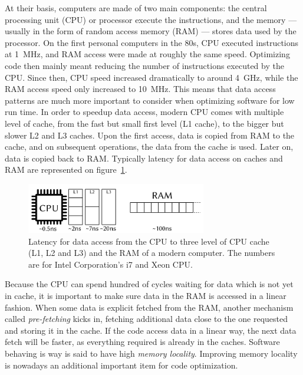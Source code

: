 \documentclass[thesis]{subfiles}
\begin{document}
At their basis, computers are made of two main components: the central
processing unit (CPU) or processor execute the instructions, and the memory ---
usually in the form of random access memory (RAM) --- stores data used by the
processor. On the first personal computers in the 80s, CPU executed instructions
at \SI{1}{MHz}, and RAM access were made at roughly the same speed. Optimizing
code then mainly meant reducing the number of instructions executed by the CPU.
Since then, CPU speed increased dramatically to around \SI{4}{GHz}, while the
RAM access speed only increased to \SI{10}{MHz}. This means that data access
patterns are much more important to consider when optimizing software for low
run time. In order to speedup data access, modern CPU comes with multiple level
of cache, from the fast but small first level (L1 cache), to the bigger but
slower L2 and L3 caches. Upon the first access, data is copied from RAM to the
cache, and on subsequent operations, the data from the cache is used. Later on,
data is copied back to RAM. Typically latency for data access on caches and RAM
are represented on figure~\ref{fig:computer-model}.

\begin{figure}[ht]
    \centering
    \includegraphics[width=0.7\textwidth]{figures/images/computer-model}
    \caption{Latency for data access from the CPU to three level of CPU cache
    (L1, L2 and L3) and the RAM of a modern computer. The numbers are for Intel
    Corporation's i7 and Xeon CPU\cite{SO-CPU-latency}.}
    \label{fig:computer-model}
\end{figure}

Because the CPU can spend hundred of cycles waiting for data which is not yet in
cache, it is important to make sure data in the RAM is accessed in a linear
fashion. When some data is explicit fetched from the RAM, another mechanism
called \emph{pre-fetching} kicks in, fetching additional data close to the one
requested and storing it in the cache. If the code access data in a linear way,
the next data fetch will be faster, as everything required is already in the
caches. Software behaving is way is said to have high \emph{memory locality}.
Improving memory locality is nowadays an additional important item for code
optimization.
\end{document}
